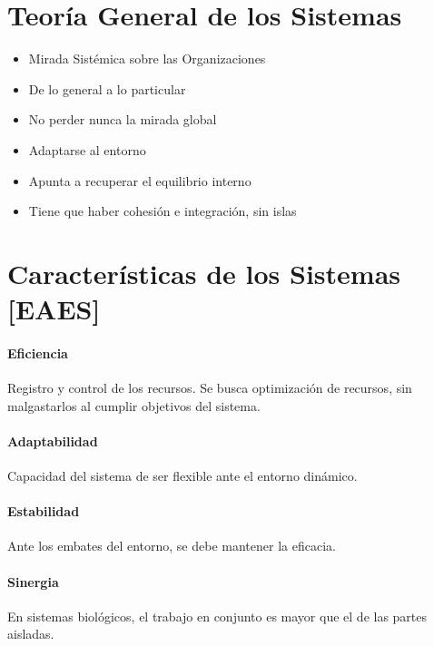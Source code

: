 \twocolumn 

\hypertarget{teoruxeda-general-de-los-sistemas}{%
\section{Teoría General de los Sistemas}\label{teoruxeda-general-de-los-sistemas}}

\begin{itemize}
  \setlength\itemsep{-1em}
\item   Mirada Sistémica sobre las Organizaciones
\item   De lo general a lo particular
\item   No perder nunca la mirada global
\item   Adaptarse al entorno
\item   Apunta a recuperar el equilibrio interno
\item   Tiene que haber cohesión e integración, sin islas
\end{itemize}

\hypertarget{caracteruxedsticas-de-los-sistemas-eaes}{%
\section{Características de los Sistemas
{[}EAES{]}}\label{caracteruxedsticas-de-los-sistemas-eaes}}

\hypertarget{eficiencia}{%
\paragraph{Eficiencia}\label{eficiencia}}
Registro y control de los recursos. Se busca optimización de recursos, sin malgastarlos al cumplir objetivos del sistema.
\hypertarget{adaptabilidad}{%
\paragraph{Adaptabilidad}\label{adaptabilidad}}
Capacidad del sistema de ser flexible ante el  entorno dinámico.
\hypertarget{estabilidad}{%
\paragraph{Estabilidad}\label{estabilidad}}
Ante los embates del entorno, se debe mantener la eficacia.
\hypertarget{sinergia}{%
\paragraph{Sinergia}\label{sinergia}}
En sistemas biológicos, el trabajo en conjunto es mayor que el de las partes aisladas.

